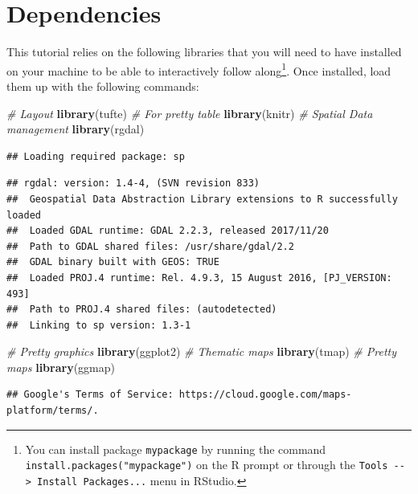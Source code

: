 \documentclass[]{book}
\newenvironment{Shaded}{\begin{snugshade}}{\end{snugshade}}
\newcommand{\CommentTok}[1]{\textcolor[rgb]{0.56,0.35,0.01}{\textit{#1}}}
\newcommand{\KeywordTok}[1]{\textcolor[rgb]{0.13,0.29,0.53}{\textbf{#1}}}
\newcommand{\NormalTok}[1]{#1}
\let\rmarkdownfootnote\footnote%
\def\footnote{\protect\rmarkdownfootnote}
\begin{document}
\hypertarget{dependencies-1}{%
\section{Dependencies}\label{dependencies-1}}

This tutorial relies on the following libraries that you will need to have installed on your machine to be able to interactively follow along\footnote{You can install package \texttt{mypackage} by running the command \texttt{install.packages("mypackage")} on the R prompt or through the \texttt{Tools\ -\/-\textgreater{}\ Install\ Packages...} menu in RStudio.}. Once installed, load them up with the following commands:

\begin{Shaded}
\begin{Highlighting}[]
\CommentTok{# Layout}
\KeywordTok{library}\NormalTok{(tufte)}
\CommentTok{# For pretty table}
\KeywordTok{library}\NormalTok{(knitr)}
\CommentTok{# Spatial Data management}
\KeywordTok{library}\NormalTok{(rgdal)}
\end{Highlighting}
\end{Shaded}

\begin{verbatim}
## Loading required package: sp
\end{verbatim}

\begin{verbatim}
## rgdal: version: 1.4-4, (SVN revision 833)
##  Geospatial Data Abstraction Library extensions to R successfully loaded
##  Loaded GDAL runtime: GDAL 2.2.3, released 2017/11/20
##  Path to GDAL shared files: /usr/share/gdal/2.2
##  GDAL binary built with GEOS: TRUE 
##  Loaded PROJ.4 runtime: Rel. 4.9.3, 15 August 2016, [PJ_VERSION: 493]
##  Path to PROJ.4 shared files: (autodetected)
##  Linking to sp version: 1.3-1
\end{verbatim}

\begin{Shaded}
\begin{Highlighting}[]
\CommentTok{# Pretty graphics}
\KeywordTok{library}\NormalTok{(ggplot2)}
\CommentTok{# Thematic maps}
\KeywordTok{library}\NormalTok{(tmap)}
\CommentTok{# Pretty maps}
\KeywordTok{library}\NormalTok{(ggmap)}
\end{Highlighting}
\end{Shaded}

\begin{verbatim}
## Google's Terms of Service: https://cloud.google.com/maps-platform/terms/.
\end{verbatim}
\end{document}
